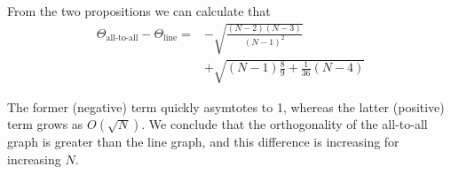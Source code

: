 From the two propositions we can calculate that
\[
\begin{aligned}
\Theta_{\text{all-to-all}} - \Theta_{\text{line}} =&
-\sqrt{ \frac{(N-2)(N-3)}{(N-1)^2}} \\
&+\sqrt{(N-1)\frac{8}{9}+\frac{1}{36}(N-4)}
\end{aligned}
\]

The former (negative) term quickly asymtotes to 1, whereas the latter (positive) term grows as $O(\sqrt{N}).$  We conclude that the orthogonality of the all-to-all graph is greater than the line graph, and this difference is increasing for increasing $N$.

